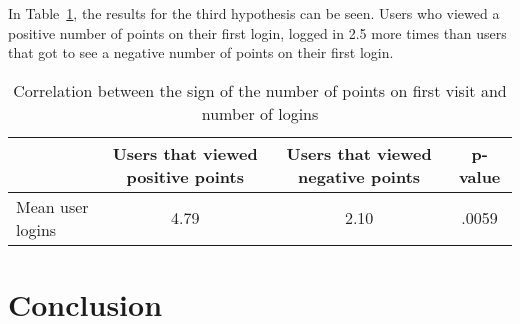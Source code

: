 \documentclass[journal]{vgtc}                %
\begin{document}
In Table~\ref{hypo3}, the results for the third hypothesis can be seen. Users who viewed a positive number of points on their first login, logged in 2.5 more times than users that got to see a negative number of points on their first login. 

\begin{table}
  \caption{Correlation between the sign of the number of points on first visit and number of logins}
  \label{hypo3}
  \scriptsize
  \begin{center}
    \begin{tabular}{lccc}
    \multicolumn{1}{p{2cm}}{\centering } &
       \multicolumn{1}{p{2cm}}{\centering Users that viewed positive points} &
       \multicolumn{1}{p{2cm}}{\centering Users that viewed negative points} &
       \multicolumn{1}{p{1cm}}{\centering p-value} \\
    \hline
      Mean user logins &  4.79 & 2.10 & .0059\\

    \end{tabular}
  \end{center}
\end{table}



\section{Conclusion}





\end{document}
